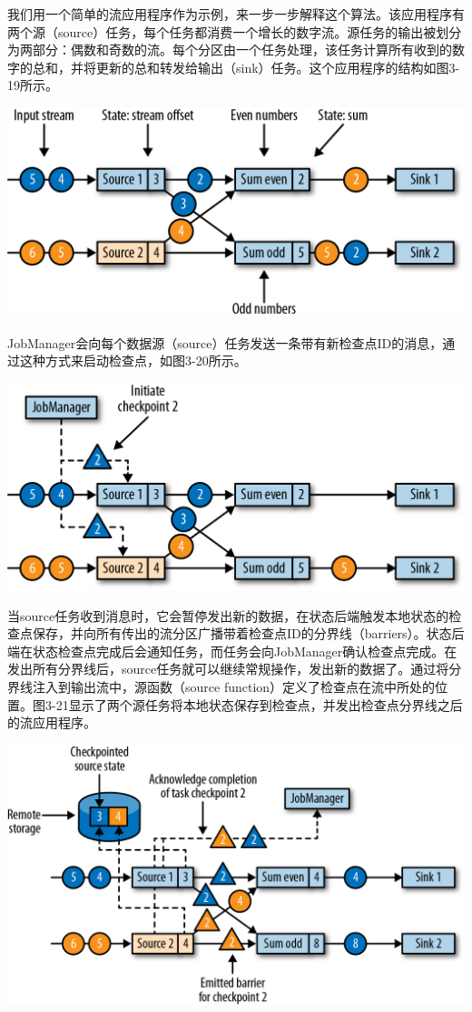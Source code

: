 \documentclass[oneside]{ctexbook}
\begin{document}
我们用一个简单的流应用程序作为示例，来一步一步解释这个算法。该应用程序有两个源（source）任务，每个任务都消费一个增长的数字流。源任务的输出被划分为两部分：偶数和奇数的流。每个分区由一个任务处理，该任务计算所有收到的数字的总和，并将更新的总和转发给输出（sink）任务。这个应用程序的结构如图3-19所示。

\noindent \includegraphics[width=\textwidth]{spaf_0319.png}

JobManager会向每个数据源（source）任务发送一条带有新检查点ID的消息，通过这种方式来启动检查点，如图3-20所示。

\noindent \includegraphics[width=\textwidth]{spaf_0320.png}

当source任务收到消息时，它会暂停发出新的数据，在状态后端触发本地状态的检查点保存，并向所有传出的流分区广播带着检查点ID的分界线（barriers）。状态后端在状态检查点完成后会通知任务，而任务会向JobManager确认检查点完成。在发出所有分界线后，source任务就可以继续常规操作，发出新的数据了。通过将分界线注入到输出流中，源函数（source function）定义了检查点在流中所处的位置。图3-21显示了两个源任务将本地状态保存到检查点，并发出检查点分界线之后的流应用程序。

\noindent \includegraphics[width=\textwidth]{spaf_0321.png}
\end{document}
